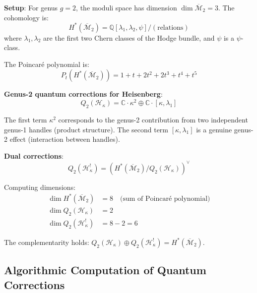 \begin{example}
\label{ex:heisenberg-genus-2-complementarity}

\textbf{Setup}: For genus $g=2$, the moduli space has dimension $\dim \overline{
\mathcal{M}}_2 = 3$. The cohomology is:
\begin{equation}
H^*(\overline{\mathcal{M}}_2) = \mathbb{Q}[\lambda_1, \lambda_2, \psi] / (\text{relations})
\end{equation}
where $\lambda_1, \lambda_2$ are the first two Chern classes of the Hodge bundle, and 
$\psi$ is a $\psi$-class.

The Poincaré polynomial is:
\begin{equation}
P_t(H^*(\overline{\mathcal{M}}_2)) = 1 + t + 2t^2 + 2t^3 + t^4 + t^5
\end{equation}

\textbf{Genus-2 quantum corrections for Heisenberg}:
\begin{equation}
Q_2(\mathcal{H}_\kappa) = \mathbb{C} \cdot \kappa^2 \oplus \mathbb{C} \cdot [\kappa, 
\lambda_1]
\end{equation}

The first term $\kappa^2$ corresponds to the genus-2 contribution from two independent 
genus-1 handles (product structure). The second term $[\kappa, \lambda_1]$ is a 
genuine genus-2 effect (interaction between handles).

\textbf{Dual corrections}:
\begin{equation}
Q_2(\mathcal{H}_\kappa^!) = \left(H^*(\overline{\mathcal{M}}_2) / Q_2(\mathcal{H}_\kappa)
\right)^\vee
\end{equation}

Computing dimensions:
\begin{align}
\dim H^*(\overline{\mathcal{M}}_2) &= 8 \quad \text{(sum of Poincaré polynomial)}\\
\dim Q_2(\mathcal{H}_\kappa) &= 2\\
\dim Q_2(\mathcal{H}_\kappa^!) &= 8 - 2 = 6
\end{align}

The complementarity holds: $Q_2(\mathcal{H}_\kappa) \oplus Q_2(\mathcal{H}_\kappa^!) 
= H^*(\overline{\mathcal{M}}_2)$.
\end{example}

\subsection{Algorithmic Computation of Quantum Corrections}

